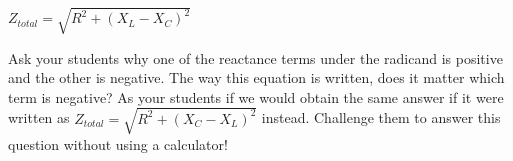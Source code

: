 
$Z_{total} = \sqrt{R^2 + (X_L - X_C)^2}$







Ask your students why one of the reactance terms under the radicand is positive and the other is negative.  The way this equation is written, does it matter which term is negative?  As your students if we would obtain the same answer if it were written as $Z_{total} = \sqrt{R^2 + (X_C - X_L)^2}$ instead.  Challenge them to answer this question without using a calculator!




